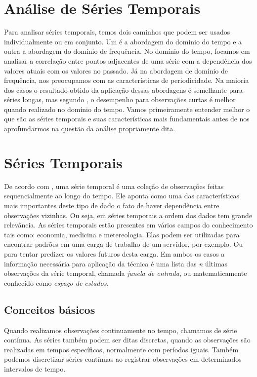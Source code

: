 \documentclass[twoside,english,brazilian]{UNISINOSmonografia}
\begin{document}
\section{Análise de Séries Temporais}
Para analisar séries temporais, temos dois caminhos que podem ser usados individualmente ou em conjunto. Um é a abordagem do dominio do tempo e a outra a abordagem do domínio de frequência. No domínio do tempo, focamos em analisar a correlação entre pontos adjacentes de uma série com a dependência dos valores atuais com os valores no passado. Já na abordagem de domínio de frequência, nos preocupamos com as características de periodicidade. Na maioria dos casos o resultado obtido da aplicação dessas abordagens é semelhante para séries longas, mas segundo \cite{Shumway2000}, o desempenho para observações curtas é melhor quando realizado no domínio do tempo.
Vamos primeiramente entender melhor o que são as séries temporais e suas características mais fundamentais antes de nos aprofundarmos na questão da análise propriamente dita.

\section{Séries Temporais}
De acordo com \cite{Ehlers2009}, uma série temporal é uma coleção de observações feitas sequencialmente ao longo do tempo. Ele aponta como uma das características mais importantes deste tipo de dado o fato de haver dependência entre observações vizinhas. Ou seja, em séries temporais a ordem dos dados tem grande relevância. As séries temporais estão presentes em vários campos do conhecimento tais como: economia, medicina e metereologia. Elas podem ser utilizadas para encontrar padrões em uma carga de trabalho de um servidor, por exemplo. Ou para tentar predizer os valores futuros desta carga. Em ambos os casos a informação necessária para aplicação da técnica é uma lista das \textit{n} últimas observações da série temporal, chamada \textit{janela de entrada}, ou matematicamente conhecido como \textit{espaço de estados}.

\subsection{Conceitos básicos}
Quando realizamos observações continuamente no tempo, chamamos de série contínua. As séries também podem ser ditas discretas, quando as observações são realizadas em tempos específicos, normalmente com períodos iguais. Também podemos discretizar séries contínuas ao registrar observações em determinados intervalos de tempo.
\end{document}
